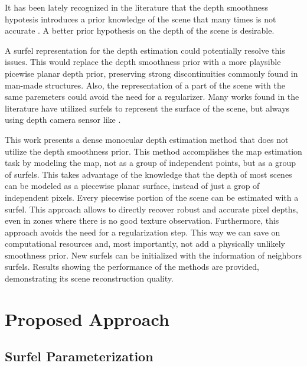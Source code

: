 \documentclass[1p]{elsarticle}
\begin{document}
It has been lately recognized in the literature that the depth smoothness hypotesis introduces a prior knowledge of the scene that many times is not accurate \cite{Engel-et-al-pami2018} \cite{Goodfellow-et-al-2016}. A better prior hypothesis on the depth of the scene is desirable.

A surfel representation for the depth estimation could potentially resolve this issues. This would replace the depth smoothness prior with a more playsible picewise planar depth prior, preserving strong discontinuities commonly found in man-made structures. Also, the representation of a part of the scene with the same paremeters could avoid the need for a regularizer. Many works found in the literature have utilized surfels to represent the surface of the scene, but always using depth camera sensor like \cite{Wang_et_al_2019} \cite{Whelan_et_al_2016}\cite{Yan_et_al_2017}.

This work presents a dense monocular depth estimation method that does not utilize the depth smoothness prior. This method accomplishes the map estimation task by modeling the map, not as a group of independent points, but as a group of surfels. This takes advantage of the knowledge that the depth of most scenes can be modeled as a piecewise planar surface, instead of just a grop of independent pixels. Every piecewise portion of the scene can be estimated with a surfel. This approach allows to directly recover robust and accurate pixel depths, even in zones where there is no good texture observation. Furthermore, this approach avoids the need for a regularization step. This way we can save on computational resources and, most importantly, not add a physically unlikely smoothness prior. New surfels can be initialized with the information of neighbors surfels. Results showing the performance of the methods are provided, demonstrating its scene reconstruction quality.


\section{Proposed Approach}

\subsection{Surfel Parameterization}
\label{sec:surfel_parameterization}
\end{document}
